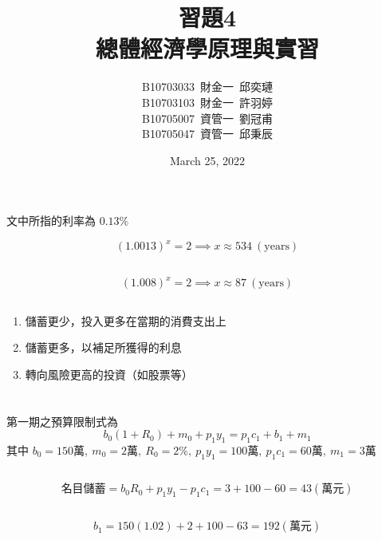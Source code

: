 \documentclass[11pt]{article}
\title{習題4 \\\Large 總體經濟學原理與實習}
\author{B10703033\ 財金一\ 邱奕璉
\\ B10703103\ 財金一\ 許羽婷
\\ B10705007\ 資管一\ 劉冠甫
\\ B10705047\ 資管一\ 邱秉辰}
\date{March 25, 2022}
\begin{document}
\maketitle

\section{} 
\subsection{}
文中所指的利率為 $0.13\%$

$$
(1.0013)^x = 2 \implies x \approx 534 \ (\text{years})
$$

\subsection{}
$$
(1.008)^x = 2 \implies x \approx 87 \ (\text{years})
$$

\subsection{}
\begin{enumerate}
    \item 儲蓄更少，投入更多在當期的消費支出上
    \item 儲蓄更多，以補足所獲得的利息
    \item 轉向風險更高的投資（如股票等）
\end{enumerate}


\section{}
\subsection{}
第一期之預算限制式為 
$$
b_0(1+R_0) + m_0 + p_1y_1 = p_1c_1+b_1+m_1
$$
其中 
$b_0 = 150\text{萬}, \ m_0 = 2\text{萬}, \ R_0 = 2\%,  \ p_1y_1 = 100\text{萬}, \ p_1c_1 = 60\text{萬},  \ m_1 = 3\text{萬}$

\subsection{}
$$
\text{名目儲蓄} = b_0R_0+p_1y_1 - p_1c_1  = 3+100 - 60 = 43(\text{萬元})
$$

\subsection{}
$$
b_1 = 150(1.02)+2+100-63 = 192(\text{萬元})
$$
\end{document}
